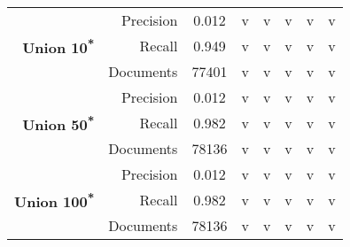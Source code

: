 \begin{table}[h!]
\begin{tabular}{rrcccccc}
        \multirow{3}{*}{\textbf{Union 10\textsuperscript{*}}} & Precision & 0.012 & v & v & v & v & v \\
                                                              & Recall    & 0.949 & v & v & v & v & v \\
                                                              & Documents & 77401 & v & v & v & v & v \\
        \midrule

        \multirow{3}{*}{\textbf{Union 50\textsuperscript{*}}} & Precision & 0.012 & v & v & v & v & v \\
                                                              & Recall    & 0.982 & v & v & v & v & v \\
                                                              & Documents & 78136 & v & v & v & v & v \\
        \midrule

        \multirow{3}{*}{\textbf{Union 100\textsuperscript{*}}} & Precision & 0.012 & v & v & v & v & v \\
                                                               & Recall    & 0.982 & v & v & v & v & v \\
                                                               & Documents & 78136 & v & v & v & v & v \\

        \bottomrule 
    \end{tabular}
\end{table}

